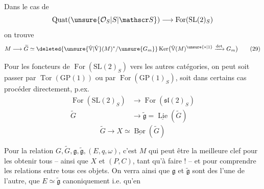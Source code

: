 Dans le cas de  
\[
\operatorname{Quat}(\unsure{\mathcal O_S|S|\mathscr S})\longrightarrow\operatorname{For}(\mathrm{SL}(2)_S)
\]
on trouve
\[
M\longrightarrow\widetilde G\simeq\deleted{\unsure{\check{\mathbb V}|\check{\mathrm V}}(M)^*/\unsure{G_m}}\operatorname{Ker}\bigl(\check{\mathbb V}(M)^{\unsure{*|1}}\xrightarrow{\det}G_m\bigr)\tag*{(29)}
\]

Pour les foncteurs de $\operatorname{For}(\mathrm{SL}(2)_S)$ vers les autres catégories, on peut soit passer par $\operatorname{Tor}(\mathrm{GP}(1))$ ou par $\operatorname{For}(\mathrm{GP}(1)_S)$, soit dans certains cas procéder directement, p.ex.
\[
\begin{aligned}
\operatorname{For}(\mathrm{SL}(2)_S)&\longrightarrow\operatorname{For}(\mathfrak{sl}(2)_S)\\
\widetilde G&\longrightarrow\widetilde{\mathfrak g}=\underline{\operatorname{Lie}}(\widetilde G)
\end{aligned}\tag*{(30)}
\]
\[
\widetilde G\longrightarrow X\simeq\underline{\operatorname{Bor}}(\widetilde G)\tag*{(31)}
\]

Pour la relation    $G,\widetilde G,\mathfrak g,\widetilde{\mathfrak g},(E,q,\omega)$, c'est $M$ qui  peut être la meilleure clef pour les obtenir tous -- ainsi que $X$ et $(P,C)$, tant qu'à faire ! -- et pour comprendre les relations entre tous ces objets. On verra ainsi que $\mathfrak g$ et $\widetilde{\mathfrak g}$ sont des  l'une de l'autre, que $E\simeq\widetilde{\mathfrak g}$ canoniquement i.e. qu'en %
